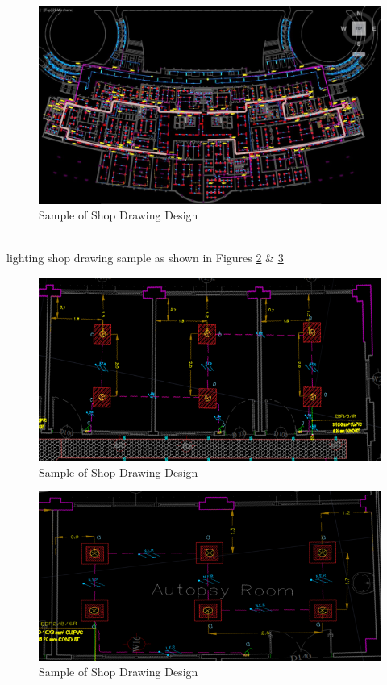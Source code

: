 \documentclass[12pt,fleqn]{book} %
\begin{document}
      \begin{figure}[!h]
    \centering
    \includegraphics[width=1\linewidth]{fikry 25.png}
    \caption{Sample of Shop Drawing Design}
    \label{fig:fikry 25}
\end{figure}
\newpage
\\lighting shop drawing sample as shown in Figures \ref{fig:f 6} \& \ref{fig:f 7}
  \begin{figure}[!h]
    \centering
    \includegraphics[width=1\linewidth]{f 6.png}
    \caption{Sample of Shop Drawing Design}
    \label{fig:f 6}
\end{figure}
  \begin{figure}[!h]
    \centering
    \includegraphics[width=1\linewidth]{f 7.png}
    \caption{Sample of Shop Drawing Design}
    \label{fig:f 7}
\end{figure}
\end{document}
